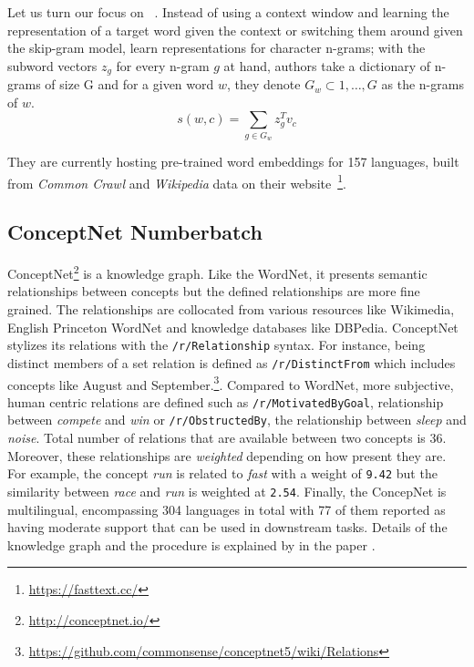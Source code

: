 Let us turn our focus on ~\cite{bojanowski_enriching_2016}.
Instead of using a context window and learning the representation of a target word given the context or switching them around given the skip-gram model, \citeauthor{bojanowski_enriching_2016} learn representations for character n-grams;
with the subword vectors $z_g$ for every n-gram $g$ at hand, authors take a dictionary of n-grams of size G and for a given word $w$, they denote $G_{w} \subset {1, \dots, G}$ as the n-grams of $w$.
\begin{displaymath}
    s(w,c) = \sum_{g \in G_{w}}z_{g}^T v_c
\end{displaymath}

They are currently hosting pre-trained word embeddings for 157 languages, built from \emph{Common Crawl} and \emph{Wikipedia} data on their website~\footnote{\url{https://fasttext.cc/}}.

\subsection{ConceptNet Numberbatch}%
\label{sub:conceptnet_numberbatch}

ConceptNet\footnote{\url{http://conceptnet.io/}} is a knowledge graph.
Like the WordNet, it presents semantic relationships between concepts but the defined relationships are more fine grained.
The relationships are collocated from various resources like Wikimedia, English Princeton WordNet and knowledge databases like DBPedia.
ConceptNet stylizes its relations with the \texttt{/r/Relationship} syntax.
For instance, being distinct members of a set relation is defined as \texttt{/r/DistinctFrom} which includes concepts like August and September.\footnote{\url{https://github.com/commonsense/conceptnet5/wiki/Relations}}.
Compared to WordNet, more subjective, human centric relations are defined such as \texttt{/r/MotivatedByGoal}, relationship between \emph{compete} and \emph{win} or \texttt{/r/ObstructedBy}, the relationship between \emph{sleep} and \emph{noise}.
Total number of relations that are available between two concepts is 36.
Moreover, these relationships are \emph{weighted} depending on how present they are.
For example, the concept \emph{run} is related to \emph{fast} with a weight of \texttt{9.42} but the similarity between \emph{race} and \emph{run} is weighted at \texttt{2.54}.
Finally, the ConcepNet is multilingual, encompassing 304 languages in total with 77 of them reported as having moderate support that can be used in downstream tasks.
Details of the knowledge graph and the procedure is explained by \textcite{speer_conceptnet_2017} in the paper .

